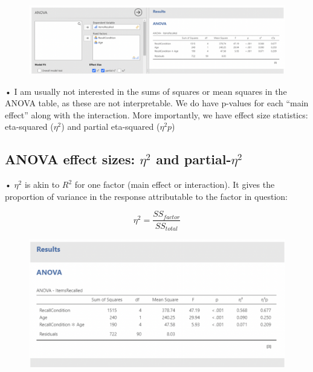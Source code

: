 \documentclass[
  letterpaper,
  DIV=11,
  numbers=noendperiod]{scrreprt}
\begin{document}
\begin{figure}

{\centering \includegraphics{images/Mod5_2.png}

}

\end{figure}

• I am usually not interested in the sums of squares or mean squares in
the ANOVA table, as these are not interpretable. We do have p-values for
each ``main effect'' along with the interaction. More importantly, we
have effect size statistics: eta-squared (\(\eta^2\)) and partial
eta-squared (\(\eta^2p\))

\hypertarget{anova-effect-sizes-eta2-and-partial-eta2}{%
\subsection{\texorpdfstring{ANOVA effect sizes: \(\eta^2\) and
partial-\(\eta^2\)}{ANOVA effect sizes: \textbackslash eta\^{}2 and partial-\textbackslash eta\^{}2}}\label{anova-effect-sizes-eta2-and-partial-eta2}}

• \(\eta^2\) is akin to \(R^2\) for one factor (main effect or
interaction). It gives the proportion of variance in the response
attributable to the factor in question:

\[
\eta^2 = \frac{SS_{factor}}{SS_{total}}
\]

\begin{figure}

{\centering \includegraphics[width=4.83333in,height=\textheight]{images/Mod5_3.png}

}

\end{figure}
\end{document}
